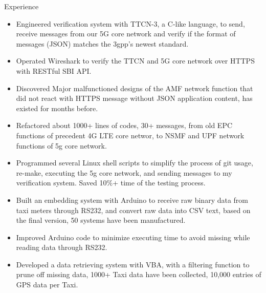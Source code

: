 \documentclass{resume} %
\begin{document}
\begin{workSection}{Experience}
    \experienceItem[
        company=Free5gc Team of NCTU,
        location=Hsinchu{,} Taiwan,
        position=Backend Engineer (Research Assistant),
        duration=Jul 2019 – Nov 2019
    ]
    \begin{itemize}
        \itemsep -6pt {} 
        \item Engineered verification system with TTCN-3{,} a C-like language{,} to send{,} receive messages from our 5G core network and verify if the format of messages (JSON) matches the 3gpp’s newest standard.
        \item Operated Wireshark to verify the TTCN and 5G core network over HTTPS with RESTful SBI API.
        \item Discovered Major malfunctioned designs of the AMF network function that did not react with HTTPS message without JSON application content{,} has existed for months before.
        \item Refactored about 1000+ lines of codes{,} 30+ messages{,} from old EPC functions of precedent 4G LTE core networ{,} to NSMF and UPF network functions of 5g core network.
        \item Programmed several Linux shell scripts to simplify the process of git usage, re-make, executing the 5g core network, and sending messages to my verification system. Saved 10\%+ time of the testing process.
     \end{itemize}

    \experienceItem[
        company=MOTC \& NCTU,
        location=Taipei{,} Taiwan,
        position=Embedded System engineer (Research Assistant),
        duration=May 2018 – Aug 2018
    ]
    \begin{itemize}
        \itemsep -6pt {} 
        \item Built an embedding system with Arduino to receive raw binary data from taxi meters through RS232, and convert raw data into CSV text, based on the final version, 50 systems have been manufactured.
        \item Improved Arduino code to minimize executing time to avoid missing while reading data through RS232.
        \item Developed a data retrieving system with VBA, with a filtering function to prune off missing data, 1000+ Taxi data have been collected, 10,000 entries of GPS data per Taxi.
     \end{itemize}
     
\end{workSection}
\end{document}
